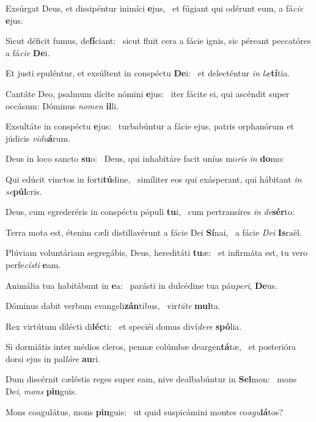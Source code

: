 \item Exsúrgat Deus, et dissipéntur inimíci \textbf{e}jus,~\psstar{} et fúgiant qui odérunt eum, a fá\textit{cie} \textbf{e}jus.
\item Sicut déficit fumus, de\textbf{fí}\-ciant:~\psstar{} sicut fluit cera a fácie ignis, sic péreant peccatóres a fá\textit{cie} \textbf{De}i.
\item Et justi epuléntur, et exsúltent in conspéctu \textbf{De}i:~\psstar{} et delecténtur \textit{in} \textit{læ}\textbf{tí}tia.
\item Cantáte Deo, psalmum dícite nómini \textbf{e}jus:~\psstar{} iter fácite ei, qui ascéndit super occásum: Dóminus \textit{nomen} \textbf{il}li.
\item Exsultáte in conspéctu \textbf{e}jus:~\psstar{} turbabúntur a fácie ejus, patris orphanórum et júdicis \textit{vidu}\textbf{á}rum.
\item Deus in loco sancto \textbf{su}o:~\psstar{} Deus, qui inhabitáre facit uníus mo\textit{ris} \textit{in} \textbf{do}mo:
\item Qui edúcit vinctos in forti\textbf{tú}dine,~\psstar{} simíliter eos qui exásperant, qui hábitant \textit{in} \textit{se}\textbf{púl}cris.
\item Deus, cum egrederéris in conspéctu pópuli \textbf{tu}i,~\psstar{} cum pertransíres \textit{in} \textit{de}\textbf{sér}to:
\item Terra mota est, étenim cæli distillavérunt a fácie Dei \textbf{Sí}nai,~\psstar{} a fácie \textit{Dei} \textbf{Is}raël.
\item Plúviam voluntáriam segregábis, Deus, hereditáti \textbf{tu}æ:~\psstar{} et infirmáta est, tu vero perfe\textit{císti} \textbf{e}am.
\item Animália tua habitábunt in \textbf{e}a:~\psstar{} parásti in dulcédine tua páu\textit{peri}, \textbf{De}us.
\item Dóminus dabit verbum evangeli\textbf{zán}tibus,~\psstar{} vir\textit{túte} \textbf{mul}ta.
\item Rex virtútum dilécti di\textbf{léc}ti:~\psstar{} et speciéi domus diví\textit{dere} \textbf{spó}lia.
\item Si dormiátis inter médios cleros, pennæ colúmbæ deargen\textbf{tá}tæ,~\psstar{} et posterióra dorsi ejus in pal\textit{lóre} \textbf{au}ri.
\item Dum discérnit cæléstis reges super eam, nive dealbabúntur in \textbf{Sel}mon:~\psstar{} mons De\textit{i}, \textit{mons} \textbf{pin}guis.
\item Mons coagulátus, mons \textbf{pin}guis:~\psstar{} ut quid suspicámini montes co\textit{agu}\textbf{lá}tos?
